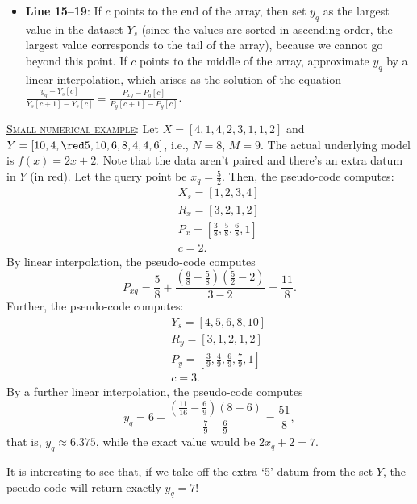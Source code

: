 \documentclass[10pt,final]{siamltex}
\begin{document}
\begin{itemize}
  \item \textbf{Line 15--19}: If $c$ points to the end of the array, then set $y_q$ as the largest value in the dataset $Y_s$ (since the values are sorted in ascending order, the largest value corresponds to the tail of the array), because we cannot go beyond this point. If $c$ points to the middle of the array, approximate $y_q$ by a linear interpolation, which arises as the solution of the equation $\tfrac{y_q-Y_s[c]}{Y_s[c+1]-Y_s[c]}=\tfrac{P_{xq}-P_y[c]}{P_y[c+1]-P_y[c]}$.
\end{itemize}




\begin{tcolorbox}[colback=gray!30,%
  colframe=black,%
  width=\dimexpr\linewidth-2\fboxrule\relax,
  arc=3mm, auto outer arc,
  breakable
  ]
  \underline{\textsc{Small numerical example}}: Let $X=[4,1,4,2,3,1,1,2]$ and $Y=[10,     4,    {\red 5},10,     6,     8,     4,     4,     6]$, i.e., $N=8$, $M=9$. The actual underlying model is $f(x)=2x+2$. Note that the data aren't paired and there's an extra datum in $Y$ (in red). Let the query point be $x_q=\tfrac{5}{2}$. Then, the pseudo-code computes:
  \begin{eqnarray*}
    && X_s = [1,     2,     3,     4]\\
    && R_x = [3,     2,     1,     2]\\
    && P_x = [\tfrac{3}{8}, \tfrac{5}{8}, \tfrac{6}{8}, 1]\\
    && c = 2.
  \end{eqnarray*}
  By linear interpolation, the pseudo-code computes
  \begin{equation*}
    P_{xq}=\frac{5}{8}+\frac{\left(\tfrac{6}{8}-\tfrac{5}{8}\right)\left(\tfrac{5}{2}-2\right)}{3-2}=\frac{11}{8}.
  \end{equation*}
  Further, the pseudo-code computes:
  \begin{eqnarray*}
    && Y_s = [4,     5,     6,     8,    10]\\
    && R_y = [3,     1,     2,     1,     2]\\
    && P_y = [\tfrac{3}{9}, \tfrac{4}{9}, \tfrac{6}{9}, \tfrac{7}{9}, 1]\\
    && c = 3.
  \end{eqnarray*}
  By a further linear interpolation, the pseudo-code computes
  \begin{equation*}
    y_q = 6 + \frac{\left(\tfrac{11}{16}-\tfrac{6}{9}\right)\left(8-6\right)}{\tfrac{7}{9}-\tfrac{6}{9}}=\frac{51}{8},
  \end{equation*}
  that is, $y_q\approx 6.375$, while the exact value would be $2x_q+2=7$.

  It is interesting to see that, if we take off the extra `5' datum from the set $Y$, the pseudo-code will return exactly $y_q=7$!
\end{tcolorbox}
%
\end{document}
